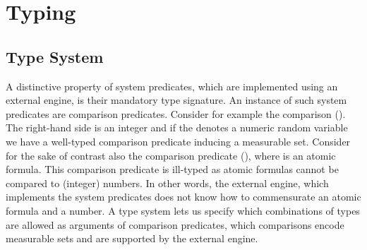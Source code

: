 \section{Typing \dcproblogsty}
\label{app:types}


\subsection{Type System}\label{sec:type_system}

A distinctive property of system predicates, which are implemented using an external engine, is their mandatory type signature.
An instance of such system predicates are comparison predicates.
Consider for example the comparison ().
The right-hand side is an integer and if the  denotes a numeric random variable we have a well-typed comparison predicate inducing a measurable set.
Consider for the sake of contrast also the comparison predicate (), where  is an atomic formula. This comparison predicate is ill-typed as atomic formulas cannot be compared to (integer) numbers. In other words, the external engine, which implements the system predicates does not know how to commensurate an atomic formula and a number.
A type system lets us specify which combinations of types are allowed as arguments of comparison predicates, \ie which comparisons encode measurable sets and are supported by the external engine.



